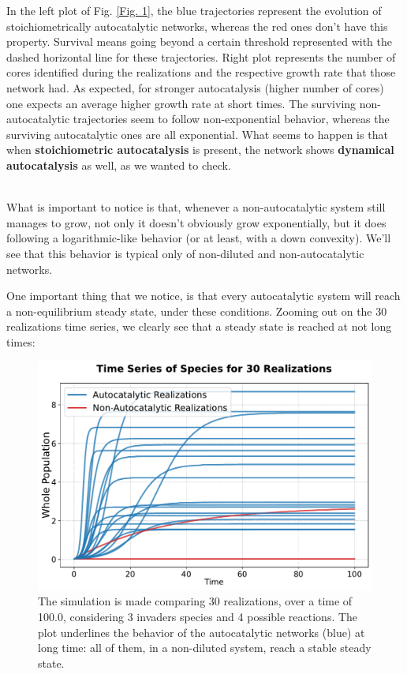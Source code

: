 \documentclass{article}
\begin{document}
In the left plot of Fig. \ref{Fig. 1}, the blue trajectories represent the evolution of stoichiometrically autocatalytic networks, whereas the red ones don't have this property. Survival means going beyond a certain threshold represented with the dashed horizontal line for these trajectories. Right plot represents the number of cores identified during the realizations and the respective growth rate that those network had. As expected, for stronger autocatalysis (higher number of cores) one expects an average higher growth rate at short times. The surviving non-autocatalytic trajectories seem to follow non-exponential behavior, whereas the surviving autocatalytic ones are all exponential. What seems to happen is that when \textbf{stoichiometric autocatalysis} is present, the network shows \textbf{dynamical autocatalysis} as well, as we wanted to check. 

\\
What is important to notice is that, whenever a non-autocatalytic system still manages to grow, not only it doesn't obviously grow exponentially, but it does following a logarithmic-like behavior (or at least, with a down convexity). We'll see that this behavior is typical only of non-diluted and non-autocatalytic networks.

One important thing that we notice, is that every autocatalytic system will reach a non-equilibrium steady state, under these conditions. Zooming out on the 30 realizations time series, we clearly see that a steady state is reached at not long times:

\begin{figure}[H]
    \centering
    \includegraphics[width=0.7\linewidth]{traj_elegant.pdf} 
    \caption{\small{The simulation is made comparing 30 realizations, over a time of 100.0, considering 3 invaders species and 4 possible reactions. The plot underlines the behavior of the autocatalytic networks (blue) at long time: all of them, in a non-diluted system, reach a stable steady state.}}
    \label{Fig. A}
\end{figure}
\end{document}
